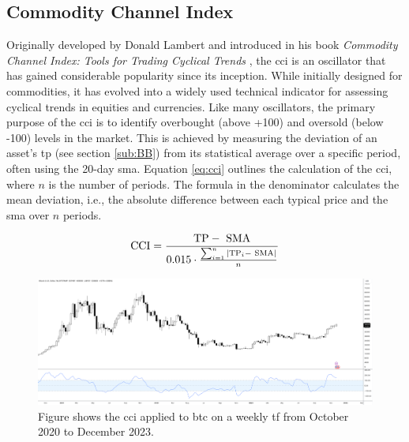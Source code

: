 \subsection{Commodity Channel Index}
\label{sub:CCI}
Originally developed by Donald Lambert and introduced in his book \textit{Commodity Channel Index: Tools for Trading Cyclical Trends} \citep{lambert1983commodity}, the \gls{cci} is an oscillator that has gained considerable popularity since its inception. While initially designed for commodities, it has evolved into a widely used technical indicator for assessing cyclical trends in equities and currencies.
\newline
\newline
Like many oscillators, the primary purpose of the \gls{cci} is to identify overbought (above +100) and oversold (below -100) levels in the market. This is achieved by measuring the deviation of an asset's \gls{tp} (see section \ref{sub:BB}) from its statistical average over a specific period, often using the 20-day \gls{sma}. Equation \ref{eq:cci} outlines the calculation of the \gls{cci}, where $n$ is the number of periods. The formula in the denominator calculates the mean deviation, i.e., the absolute difference between each typical price and the \gls{sma} over $n$ periods.

\begin{equation}
    \centering
    \text{CCI} = \frac{\text{TP} - \text{ SMA}}{0.015 \cdot \frac{\sum_{i=1}^n | \text{TP}_i - \text{ SMA} |}{n}}
    \label{eq:cci}
\end{equation}

\begin{figure}[ht]
    \centering
    \includegraphics[width=\textwidth]{./assets/img/btc-cci.png}
    \caption{Figure shows the \gls{cci} applied to \gls{btc} on a weekly \gls{tf} from October 2020 to December 2023.}
    \label{fig:cci}
\end{figure}

